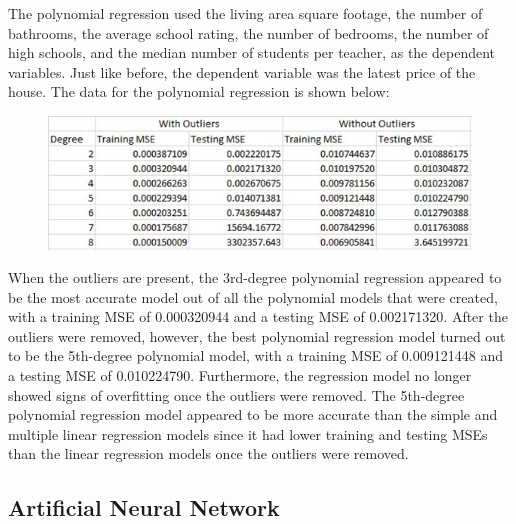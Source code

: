 \documentclass[12pt]{article}
\begin{document}
	The polynomial regression used the living area square footage, the number of bathrooms, the average school rating, the number of bedrooms, the number of high schools, and the median number of students per teacher, as the dependent variables. Just like before, the dependent variable was the latest price of the house. The data for the polynomial regression is shown below:
	
	\begin{figure}[H]
		\label{fig:fig4}
		\includegraphics[width=1\linewidth]{fig4}
	\end{figure}
	
	When the outliers are present, the 3rd-degree polynomial regression appeared to be the most accurate model out of all the polynomial models that were created, with a training MSE of 0.000320944 and a testing MSE of 0.002171320. After the outliers were removed, however, the best polynomial regression model turned out to be the 5th-degree polynomial model, with a training MSE of 0.009121448 and a testing MSE of 0.010224790. Furthermore, the regression model no longer showed signs of overfitting once the outliers were removed. The 5th-degree polynomial regression model appeared to be more accurate than the simple and multiple linear regression models since it had lower training and testing MSEs than the linear regression models once the outliers were removed.
	
	
	\subsection{Artificial Neural Network}
	
\end{document}
